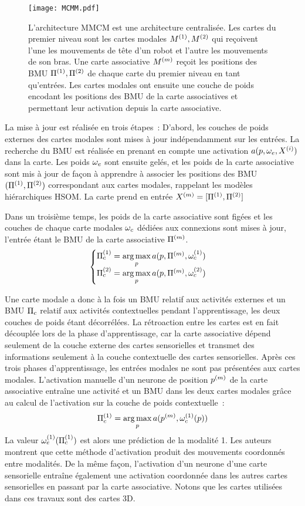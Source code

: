 \documentclass[../main]{subfiles}
\begin{document}
\begin{figure}[t]
    \centering
    \texttt{[image: MCMM.pdf]}
    \caption{L'architecture MMCM \parencite{dominey13} est une architecture centralisée.
    Les cartes du premier niveau sont les cartes modales $M^{({1})}, M^{({2})}$ qui reçoivent l'une les mouvements de tête d'un robot et l'autre les mouvements de son bras.
    Une carte associative $M^{({m})}$ reçoit les positions des BMU $\Pi^{({1})},\Pi^{({2})}$ de chaque carte du premier niveau en tant qu'entrées. 
    Les cartes modales ont ensuite une couche de poids encodant les positions des BMU de la carte associatives et permettant leur activation depuis la carte associative.
    \label{fig:mmcm}}
\end{figure}

La mise à jour est réalisée en trois étapes~: 
D'abord, les couches de poids externes des cartes modales sont mises à jour indépendamment sur les entrées. La recherche du BMU est réalisée en prenant en compte une activation $a(p, \omega_e, X^{({i})})$ dans la carte.
Les poids $\omega_e$ sont ensuite gelés, et les poids de la carte associative sont mis à jour de façon à apprendre à associer les positions des BMU $(\Pi^{({1})},\Pi^{({2})})$ correspondant aux cartes modales, rappelant les modèles hiérarchiques HSOM. La carte prend en entrée $X^{({m})} = [\Pi^{({1})}, \Pi^{({2})}]$

Dans un troisième temps, les poids de la carte associative sont figées et les couches de chaque carte modales $\omega_c$ dédiées aux connexions sont mises à jour, l'entrée étant le BMU de la carte associative $\Pi^{({m})}$.
\begin{equation*}
    \begin{cases}
        \Pi_c^{({1})} = \operatorname*{arg\,max}\limits_p a(p, \Pi^{({m})}, \omega_c^{({1})})\\
        \Pi_c^{({2})} = \operatorname*{arg\,max}\limits_p a(p, \Pi^{({m})}, \omega_c^{({2})})
    \end{cases}
    \end{equation*}

Une carte modale a donc à la fois un BMU relatif aux activités externes et un BMU $\Pi_c$ relatif aux activités contextuelles pendant l'apprentissage, les deux couches de poids étant décorrélées.
La rétroaction entre les cartes est en fait découplée lors de la phase d'apprentissage, car la carte associative dépend seulement de la couche externe des cartes sensorielles et transmet des informations seulement à la couche contextuelle des cartes sensorielles.
Après ces trois phases d'apprentissage, les entrées modales ne sont pas présentées aux cartes modales. L'activation manuelle d'un neurone de position $p^{({m})}$ de la carte associative entraîne une activité et un BMU dans les deux cartes modales grâce au calcul de l'activation sur la couche de poids contextuelle~: 
$$ \Pi_c^{({1})} = \operatorname*{arg\,max}\limits_p a(p^{({m})},\omega_c^{({1})}(p))$$
La valeur $\omega_e^{({1})}(\Pi_c^{({1})})$ est alors une prédiction de la modalité 1.
Les auteurs montrent que cette méthode d'activation produit des mouvements coordonnés entre modalités.
De la même façon, l'activation d'un neurone d'une carte sensorielle entraîne également une activation coordonnée dans les autres cartes sensorielles en passant par la carte associative.
Notons que les cartes utilisées dans ces travaux sont des cartes 3D.
\end{document}
